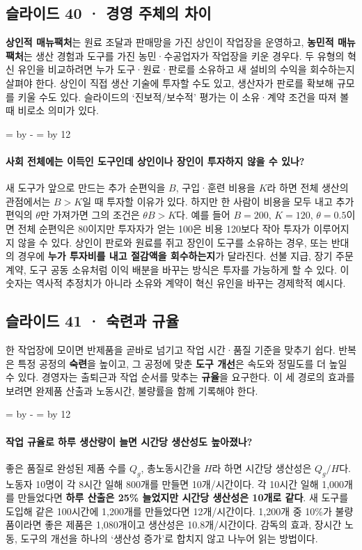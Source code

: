 \documentclass[10pt,a4paper]{article}
\newcommand{\ReserveQuestionSpace}{%
  \par\begingroup
  \dimen0=\pagegoal \advance\dimen0 by -\pagetotal
  \dimen2=\baselineskip \multiply\dimen2 by 12
  \ifdim\dimen0<\dimen2 \newpage\fi
  \endgroup}
\begin{document}
\subsection{슬라이드 40 · 경영 주체의 차이}
\textbf{상인적 매뉴팩처}는 원료 조달과 판매망을 가진 상인이 작업장을 운영하고, \textbf{농민적 매뉴팩처}는 생산 경험과 도구를 가진 농민·수공업자가 작업장을 키운 경우다. 두 유형의 혁신 유인을 비교하려면 누가 도구·원료·판로를 소유하고 새 설비의 수익을 회수하는지 살펴야 한다. 상인이 직접 생산 기술에 투자할 수도 있고, 생산자가 판로를 확보해 규모를 키울 수도 있다. 슬라이드의 ‘진보적/보수적’ 평가는 이 소유·계약 조건을 따져 볼 때 비로소 의미가 있다.\par

\ReserveQuestionSpace
\paragraph{사회 전체에는 이득인 도구인데 상인이나 장인이 투자하지 않을 수 있나?}
새 도구가 앞으로 만드는 추가 순편익을 $B$, 구입·훈련 비용을 $K$라 하면 전체 생산의 관점에서는 $B>K$일 때 투자할 이유가 있다. 하지만 한 사람이 비용을 모두 내고 추가 편익의 $\theta$만 가져가면 그의 조건은 $\theta B>K$다. 예를 들어 $B=200$, $K=120$, $\theta=0.5$이면 전체 순편익은 80이지만 투자자가 얻는 100은 비용 120보다 작아 투자가 이루어지지 않을 수 있다. 상인이 판로와 원료를 쥐고 장인이 도구를 소유하는 경우, 또는 반대의 경우에 \textbf{누가 투자비를 내고 절감액을 회수하는지}가 달라진다. 선불 지급, 장기 주문 계약, 도구 공동 소유처럼 이익 배분을 바꾸는 방식은 투자를 가능하게 할 수 있다. 이 숫자는 역사적 추정치가 아니라 소유와 계약이 혁신 유인을 바꾸는 경제학적 예시다.\par

\subsection{슬라이드 41 · 숙련과 규율}
한 작업장에 모이면 반제품을 곧바로 넘기고 작업 시간·품질 기준을 맞추기 쉽다. 반복은 특정 공정의 \textbf{숙련}을 높이고, 그 공정에 맞춘 \textbf{도구 개선}은 속도와 정밀도를 더 높일 수 있다. 경영자는 출퇴근과 작업 순서를 맞추는 \textbf{규율}을 요구한다. 이 세 경로의 효과를 보려면 완제품 산출과 노동시간, 불량률을 함께 기록해야 한다.\par

\ReserveQuestionSpace
\paragraph{작업 규율로 하루 생산량이 늘면 시간당 생산성도 높아졌나?}
좋은 품질로 완성된 제품 수를 $Q_g$, 총노동시간을 $H$라 하면 시간당 생산성은 $Q_g/H$다. 노동자 10명이 각 8시간 일해 800개를 만들면 10개/시간이다. 각 10시간 일해 1,000개를 만들었다면 \textbf{하루 산출은 25\% 늘었지만 시간당 생산성은 10개로 같다}. 새 도구를 도입해 같은 100시간에 1,200개를 만들었다면 12개/시간이다. 1,200개 중 10\%가 불량품이라면 좋은 제품은 1,080개이고 생산성은 10.8개/시간이다. 감독의 효과, 장시간 노동, 도구의 개선을 하나의 ‘생산성 증가’로 합치지 않고 나누어 읽는 방법이다.\par
\end{document}
